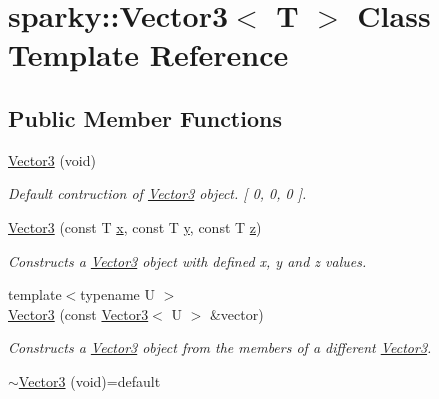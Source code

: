 \hypertarget{classsparky_1_1_vector3}{}\section{sparky\+:\+:Vector3$<$ T $>$ Class Template Reference}
\label{classsparky_1_1_vector3}
\subsection*{Public Member Functions}
\begin{DoxyCompactItemize}
\item 
\hyperlink{classsparky_1_1_vector3_a2d68e1433d9819c627232cacd933f268}{Vector3} (void)\hypertarget{classsparky_1_1_vector3_a2d68e1433d9819c627232cacd933f268}{}\label{classsparky_1_1_vector3_a2d68e1433d9819c627232cacd933f268}

\begin{DoxyCompactList}\small\item\em Default contruction of \hyperlink{classsparky_1_1_vector3}{Vector3} object. \mbox{[} 0, 0, 0 \mbox{]}. \end{DoxyCompactList}\item 
\hyperlink{classsparky_1_1_vector3_a08f2fea9c4f2fa3cc876fba63664c96a}{Vector3} (const T \hyperlink{classsparky_1_1_vector3_aaf08291c98a0e2c472afcdc1eb6e2947}{x}, const T \hyperlink{classsparky_1_1_vector3_ad39b81dab4583e170eee844f1ed80b38}{y}, const T \hyperlink{classsparky_1_1_vector3_ab784d68d4c4b9d799d1984ab06b802cf}{z})
\begin{DoxyCompactList}\small\item\em Constructs a \hyperlink{classsparky_1_1_vector3}{Vector3} object with defined x, y and z values. \end{DoxyCompactList}\item 
{\footnotesize template$<$typename U $>$ }\\\hyperlink{classsparky_1_1_vector3_a973230e25afd996d1c34b41999475b56}{Vector3} (const \hyperlink{classsparky_1_1_vector3}{Vector3}$<$ U $>$ \&vector)
\begin{DoxyCompactList}\small\item\em Constructs a \hyperlink{classsparky_1_1_vector3}{Vector3} object from the members of a different \hyperlink{classsparky_1_1_vector3}{Vector3}. \end{DoxyCompactList}\item 
\hyperlink{classsparky_1_1_vector3_aaf1e942d4976b4af370f0d57f7e0a253}{$\sim$\+Vector3} (void)=default\hypertarget{classsparky_1_1_vector3_aaf1e942d4976b4af370f0d57f7e0a253}{}\label{classsparky_1_1_vector3_aaf1e942d4976b4af370f0d57f7e0a253}


\end{DoxyCompactItemize}
